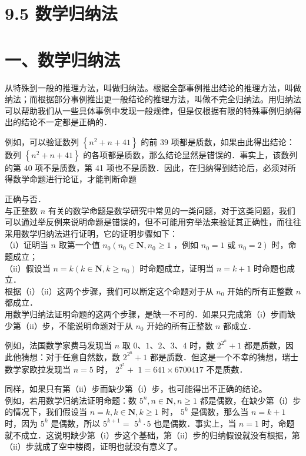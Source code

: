 \documentclass[10pt]{article}
\begin{document}
\section*{9.5 数学归纳法}
\section*{一、数学归纳法}
从特殊到一般的推理方法，叫做归纳法。根据全部事例推出结论的推理方法，叫做纳法；而根据部分事例推出更一般结论的推理方法，叫做不完全归纳法。用归纳法可以帮助我们从一些具体事例中发现一般规律，但是仅根据有限的特殊事例归纳得出的结论不一定都是正确的．

例如，可以验证数列 \(\left\{n^{2}+n+41\right\}\) 的前 39 项都是质数，如果由此得出结论：数列 \(\left\{n^{2}+n+41\right\}\) 的各项都是质数，那么结论显然是错误的．事实上，该数列的第 40 项不是质数，第 41 项也不是质数．因此，在归纳得到结论后，必须对所得数学命题进行论证，才能判断命题

正确与否．\\
与正整数 \(n\) 有关的数学命题是数学研究中常见的一类问题，对于这类问题，我们可以通过举反例来说明命题是错误的，但不可能用穷举法来验证其正确性，而往往采用数学归纳法进行证明，它的证明步骤如下：\\
（i）证明当 \(n\) 取第一个值 \(n_{0}\left(n_{0} \in \mathbf{N}, n_{0} \geqslant 1\right.\) ，例如 \(n_{0}=1\) 或 \(\left.n_{0}=2\right)\) 时，命题成立；\\
（ii）假设当 \(n=k\left(k \in \mathbf{N}, k \geqslant n_{0}\right)\) 时命题成立，证明当 \(n=k+1\) 时命题也成立．\\
根据（i）（ii）这两个步骤，我们可以断定这个命题对于从 \(n_{0}\) 开始的所有正整数 \(n\) 都成立．\\
用数学归纳法证明命题的这两个步骤，是缺一不可的．如果只完成第（i）步而缺少第（ii）步，不能说明命题对于从 \(n_{0}\) 开始的所有正整数 \(n\) 都成立．

例如，法国数学家费马发现当 \(n\) 取 \(0 、 1 、 2 、 3 、 4\) 时，数 \(2^{2^{n}}+1\) 都是质数，因此他猜想：对于任意自然数，数 \(2^{2^{n}}+1\) 都是质数．但这是一个不幸的猜想，瑞士数学家欧拉发现当 \(n=5\) 时， \(2^{2^{5}}+\) \(1=641 \times 6700417\) 不是质数．

同样，如果只有第（ii）步而缺少第（i）步，也可能得出不正确的结论。\\
例如，若用数学归纳法证明命题：数 \(5^{n}, n \in \mathbf{N}, n \geqslant 1\) 都是偶数，在缺少第（i）步的情况下，我们假设当 \(n=k, k \in \mathbf{N}, k \geqslant 1\) 时， \(5^{k}\) 是偶数，那么当 \(n=k+1\) 时，因为 \(5^{k}\) 是偶数，所以 \(5^{k+1}=\) \(5^{k} \cdot 5\) 也是偶数．事实上，当 \(n=1\) 时，命题就不成立．这说明缺少第（i）步这个基础，第（ii）步的归纳假设就没有根据，第（ii）步就成了空中楼阁，证明也就没有意义了。
\end{document}
